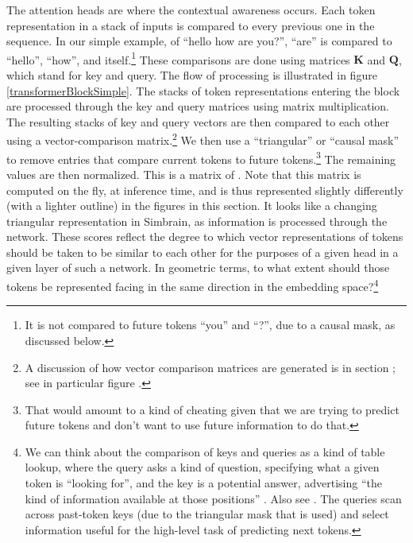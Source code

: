 The attention heads are where the contextual awareness occurs. Each token
representation in a stack of inputs is compared to every previous one in the sequence. In our
simple example, of ``hello how are you?'', ``are'' is compared to ``hello'', ``how'', and itself.\footnote{It is not compared to future tokens ``you'' and ``?'', due to a causal mask, as discussed below.} These comparisons are done using matrices $\textbf{K}$ and $\textbf{Q}$, which stand for key and query. The flow of processing is illustrated in figure \ref{transformerBlockSimple}. The stacks of token representations entering the block are processed through the key and query matrices using matrix multiplication. The resulting stacks of key and query vectors are then compared to each other using a vector-comparison matrix.\footnote{A discussion of how vector comparison matrices are generated is in section ; see in particular figure .} We then use a ``triangular'' or ``causal mask'' to remove entries that compare current tokens to future tokens.\footnote{That would amount to a kind of cheating given that we are trying to predict future tokens and don't want to use future information to do that.} The remaining values are then normalized. This is a matrix of . Note that this matrix is computed on the fly, at inference time, and is thus represented slightly differently (with a lighter outline) in the figures in this section. It looks like a changing triangular representation in Simbrain, as information is processed through the network. These scores reflect the  degree to which vector representations of tokens should be taken to be similar to each other for the purposes of a given head in a given layer of such a network. In geometric terms, to what extent should those tokens  be represented facing in the same direction in the embedding space?\footnote{We can think about the comparison of keys and queries as a kind of table lookup, where the query asks a kind of question, specifying what a given token is ``looking for'', and the key is a potential answer, advertising ``the kind of information available at those positions'' \cite{beckmann2025mechanistic}. Also see . The queries scan across past-token keys (due to the triangular mask that is used) and select information useful for the high-level task of predicting next tokens.} 

